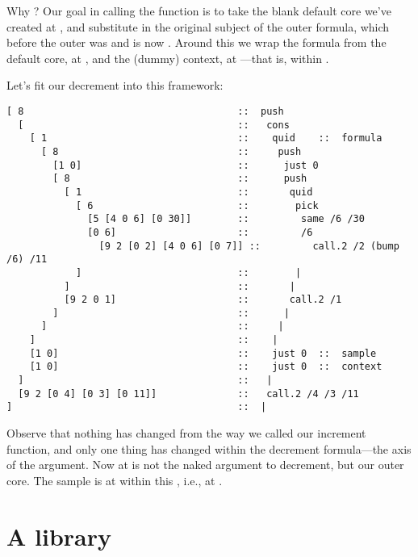 Why \kode{[[0 4] [0 3] [0 11]]}?  Our goal in calling the function is
to take the blank default core we've created at , and
substitute in the original subject of the outer formula, which
before the outer  was  and is now .  Around this
we wrap the formula from the default core, at , and the
(dummy) context, at ---that is,  within .

Let's fit our decrement into this framework:

\begin{framed_shaded}
\begin{Verbatim}[fontsize=\relsize{-2.5},fontseries=b,commandchars=\\\{\}]
[ 8                                     ::  push
  [                                     ::   cons
    [ 1                                 ::    quid    ::  formula
      [ 8                               ::     push
        [1 0]                           ::      just 0
        [ 8                             ::      push
          [ 1                           ::       quid
            [ 6                         ::        pick
              [5 [4 0 6] [0 30]]        ::         same /6 /30
              [0 6]                     ::         /6
                [9 2 [0 2] [4 0 6] [0 7]] ::         call.2 /2 (bump /6) /11
            ]                           ::        |
          ]                             ::       |
          [9 2 0 1]                     ::       call.2 /1
        ]                               ::      |
      ]                                 ::     |
    ]                                   ::    |
    [1 0]                               ::    just 0  ::  sample
    [1 0]                               ::    just 0  ::  context
  ]                                     ::   |
  [9 2 [0 4] [0 3] [0 11]]              ::   call.2 /4 /3 /11
]                                       ::  |
\end{Verbatim}
\end{framed_shaded}

Observe that nothing has changed from the way we called our
increment function, and only one thing has changed within the
decrement formula---the axis of the argument.  Now at  is not
the naked argument to decrement, but our outer core.  The sample
is at  within this , i.e., at .

\section{A library}

